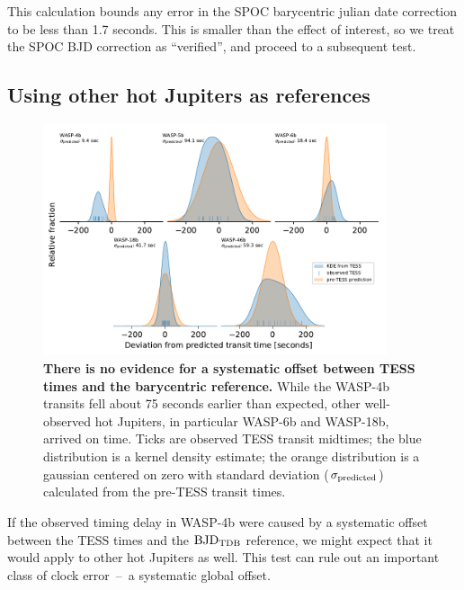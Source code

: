 \documentclass[12pt,twocolumn,tighten]{aastex62}
\begin{document}
This calculation bounds any error in the SPOC barycentric julian date
correction to be less than 1.7 seconds.  This is smaller than the
effect of interest, so we treat the SPOC BJD correction as
``verified'', and proceed to a subsequent test.


\subsection{Using other hot Jupiters as references}
\label{sec:hj_verification}

\begin{figure}[ht!]
  \begin{center}
    \leavevmode
    \includegraphics[width=0.9\textwidth]{f6.pdf}
  \end{center}
  \vspace{-0.5cm}
  \caption{
    {\bf There is no evidence for a systematic offset between TESS
    times and the barycentric reference.} While the WASP-4b transits
    fell about 75 seconds earlier than expected, other well-observed
    hot Jupiters, in particular WASP-6b and WASP-18b, arrived on time.
    Ticks are observed TESS transit midtimes; the blue distribution is
    a kernel density estimate; the orange distribution is a gaussian
    centered on zero with standard deviation ($\sigma_{\rm
    predicted}$) calculated from the pre-TESS transit times.
    \label{fig:hjs}
  }
\end{figure}

If the observed timing delay in WASP-4b were caused by a systematic
offset between the TESS times and the ${\rm
BJD}_{\rm TDB}$ reference, we might expect that it would apply to
other hot Jupiters as well.  This test can rule out an important class
of clock error~--~a systematic global offset.
\end{document}
